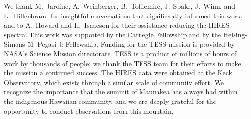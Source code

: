 \documentclass[11pt,twocolumn,tighten,linenumbers]{aastex7}
\begin{document}

\clearpage





\begin{acknowledgements}
  We thank M.~Jardine, A.~Weinberger, B.~Tofflemire,
  J.~Spake, J.~Winn, and L.~Hillenbrand for insightful conversations
  that significantly informed this work, and to A.~Howard and
  H.~Isaacson for their assistance reducing the HIRES spectra.
  This work was supported by the Carnegie Fellowship and by the
  Heising-Simons 51~Pegasi~b Fellowship.
  Funding for the TESS mission is provided by NASA’s Science Mission
  directorate.
  TESS is a product of millions of hours of work by thousands of people;
  we thank the TESS team for their efforts to make the mission a
  continued success.
  The HIRES data were obtained at the Keck Observatory, which exists
  through a similar scale of community effort.
  We recognize the importance that the summit of Maunakea has always had
  within the indigenous Hawaiian community, and we are deeply grateful 
  for the opportunity to conduct observations from this mountain.
\end{acknowledgements}


\end{document}
